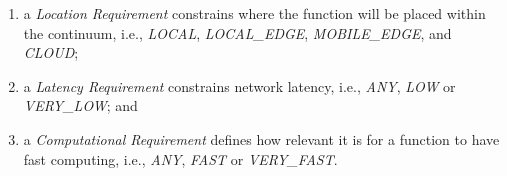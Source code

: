 \begin{enumerate}

	\item a \textit{Location Requirement} constrains where the function will be placed within the continuum, i.e., \textit{LOCAL}, \textit{LOCAL\_EDGE}, \textit{MOBILE\_EDGE}, and \textit{CLOUD}; 

	\item a \textit{Latency Requirement} constrains network latency, i.e., \textit{ANY}, \textit{LOW} or \textit{VERY\_LOW}; and 
	
	\item a \textit{Computational Requirement} defines how relevant it is for a function to have fast computing, i.e., \textit{ANY}, \textit{FAST} or \textit{VERY\_FAST}. 

\end{enumerate}



